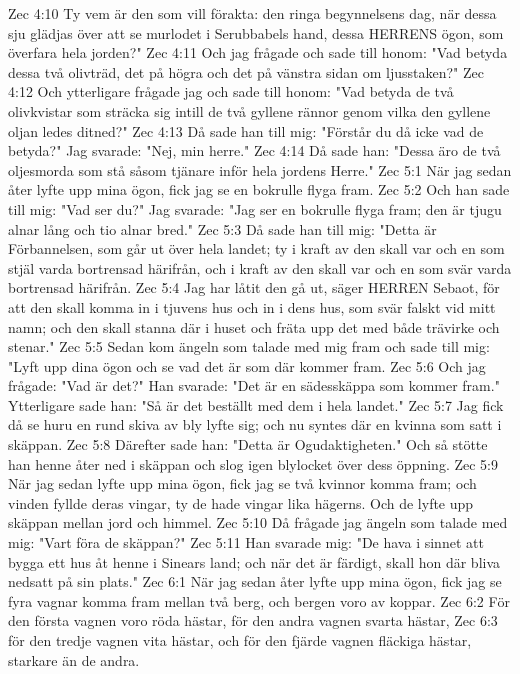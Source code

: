 Zec 4:10  Ty vem är den som vill förakta: den ringa begynnelsens dag, när dessa sju glädjas över att se murlodet i Serubbabels hand, dessa HERRENS ögon, som överfara hela jorden?"
Zec 4:11  Och jag frågade och sade till honom: "Vad betyda dessa två olivträd, det på högra och det på vänstra sidan om ljusstaken?"
Zec 4:12  Och ytterligare frågade jag och sade till honom: "Vad betyda de två olivkvistar som sträcka sig intill de två gyllene rännor genom vilka den gyllene oljan ledes ditned?"
Zec 4:13  Då sade han till mig: "Förstår du då icke vad de betyda?" Jag svarade: "Nej, min herre."
Zec 4:14  Då sade han: "Dessa äro de två oljesmorda som stå såsom tjänare inför hela jordens Herre."
Zec 5:1  När jag sedan åter lyfte upp mina ögon, fick jag se en bokrulle flyga fram.
Zec 5:2  Och han sade till mig: "Vad ser du?" Jag svarade: "Jag ser en bokrulle flyga fram; den är tjugu alnar lång och tio alnar bred."
Zec 5:3  Då sade han till mig: "Detta är Förbannelsen, som går ut över hela landet; ty i kraft av den skall var och en som stjäl varda bortrensad härifrån, och i kraft av den skall var och en som svär varda bortrensad härifrån.
Zec 5:4  Jag har låtit den gå ut, säger HERREN Sebaot, för att den skall komma in i tjuvens hus och in i dens hus, som svär falskt vid mitt namn; och den skall stanna där i huset och fräta upp det med både trävirke och stenar."
Zec 5:5  Sedan kom ängeln som talade med mig fram och sade till mig: "Lyft upp dina ögon och se vad det är som där kommer fram.
Zec 5:6  Och jag frågade: "Vad är det?" Han svarade: "Det är en sädesskäppa som kommer fram." Ytterligare sade han: "Så är det beställt med dem i hela landet."
Zec 5:7  Jag fick då se huru en rund skiva av bly lyfte sig; och nu syntes där en kvinna som satt i skäppan.
Zec 5:8  Därefter sade han: "Detta är Ogudaktigheten." Och så stötte han henne åter ned i skäppan och slog igen blylocket över dess öppning.
Zec 5:9  När jag sedan lyfte upp mina ögon, fick jag se två kvinnor komma fram; och vinden fyllde deras vingar, ty de hade vingar lika hägerns. Och de lyfte upp skäppan mellan jord och himmel.
Zec 5:10  Då frågade jag ängeln som talade med mig: "Vart föra de skäppan?"
Zec 5:11  Han svarade mig: "De hava i sinnet att bygga ett hus åt henne i Sinears land; och när det är färdigt, skall hon där bliva nedsatt på sin plats."
Zec 6:1  När jag sedan åter lyfte upp mina ögon, fick jag se fyra vagnar komma fram mellan två berg, och bergen voro av koppar.
Zec 6:2  För den första vagnen voro röda hästar, för den andra vagnen svarta hästar,
Zec 6:3  för den tredje vagnen vita hästar, och för den fjärde vagnen fläckiga hästar, starkare än de andra.
